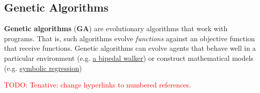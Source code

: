 \documentclass{article}
\begin{document}
\subsection{Genetic Algorithms}
\label{sec:genalg}
\textbf{Genetic algorithms} (\textbf{GA}) are evolutionary algorithms that work with programs. That is, such algorithms evolve \textit{functions} against an objective function that receive functions. Genetic algorithms can evolve agents that behave well in a particular environment (e.g. \href{https://www.mdpi.com/2227-7390/11/13/2931}{a bipedal walker}) or construct mathematical models (e.g. \href{https://link.springer.com/article/10.1007/s11831-023-09922-z}{symbolic regression})

\textcolor{red}{TODO: Tenative: change hyperlinks to numbered references.}
\end{document}
